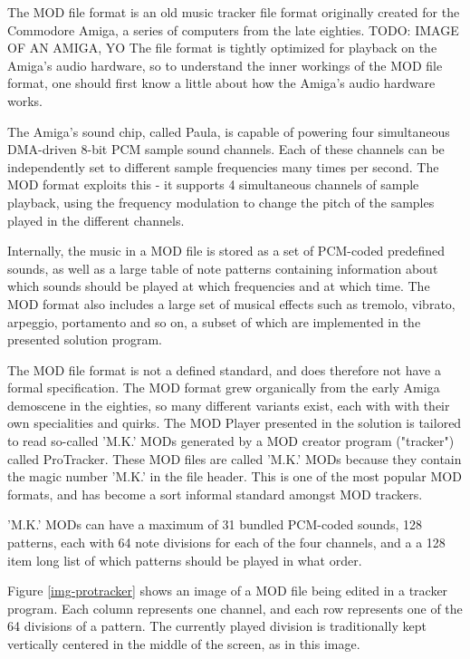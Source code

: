 
The MOD file format is an old music tracker file format originally created for the Commodore Amiga, a series of computers from the late eighties. TODO: IMAGE OF AN AMIGA, YO
The file format is tightly optimized for playback on the Amiga's audio hardware, so to understand the inner workings of the MOD file format, one should first know a little about how the Amiga's audio hardware works.

The Amiga's sound chip, called Paula, is capable of powering four simultaneous DMA-driven 8-bit PCM sample sound channels.
Each of these channels can be independently set to different sample frequencies many times per second.
The MOD format exploits this - it supports 4 simultaneous channels of sample playback, using the frequency modulation to change the pitch of the samples played in the different channels.

Internally, the music in a MOD file is stored as a set of PCM-coded predefined sounds, as well as a large table of note patterns containing information about which sounds should be played at which frequencies and at which time.
The MOD format also includes a large set of musical effects such as tremolo, vibrato, arpeggio, portamento and so on, a subset of which are implemented in the presented solution program.

The MOD file format is not a defined standard, and does therefore not have a formal specification.
The MOD format grew organically from the early Amiga demoscene in the eighties, so many different variants exist, each with with their own specialities and quirks.
The MOD Player presented in the solution is tailored to read so-called 'M.K.' MODs generated by a MOD creator program ("tracker") called ProTracker.
These MOD files are called 'M.K.' MODs because they contain the magic number 'M.K.' in the file header.
This is one of the most popular MOD formats, and has become a sort informal standard amongst MOD trackers.

'M.K.' MODs can have a maximum of 31 bundled PCM-coded sounds, 128 patterns, each with 64 note divisions for each of the four channels, and a a 128 item long list of which patterns should be played in what order.

Figure \ref{img-protracker} shows an image of a MOD file being edited in a tracker program.
Each column represents one channel, and each row represents one of the 64 divisions of a pattern.
The currently played division is traditionally kept vertically centered in the middle of the screen, as in this image.


